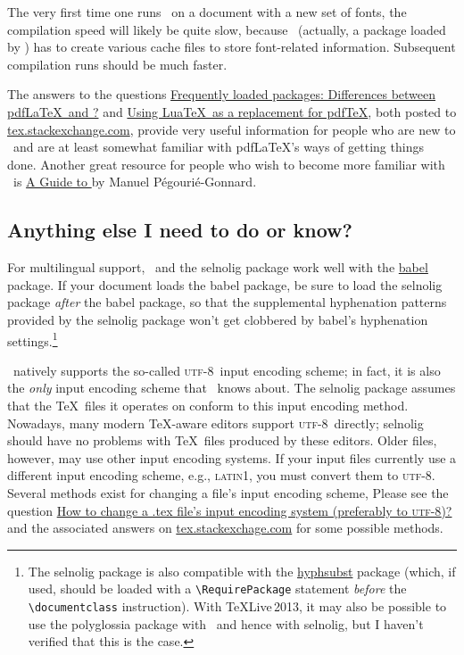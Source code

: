 \documentclass[11pt]{article}
\newcommand{\pkg}[1]{\textsf{#1}}
\newcommand\utf{\textsc{utf-8}}
\begin{document}
The very first time one runs \LuaLaTeX\ on a document with a new set of fonts, the compilation speed will likely be quite slow, because \LuaLaTeX\ (actually, a package loaded by \LuaLaTeX) has to create various cache files to store font-related information. Subsequent compilation runs should be much faster. 

The answers to the questions \href{http://tex.stackexchange.com/q/28642/5001}{Frequently loaded packages: Differences between pdf\LaTeX\ and \LuaLaTeX?} and \href{http://tex.stackexchange.com/q/32295/5001}{Using Lua\TeX\ as a replacement for pdf\TeX}, both posted to \href{http://tex.stackexchange.com/}{tex.stackexchange.com}, provide very useful information for people who are new to \LuaLaTeX\ and are at least somewhat familiar with pdf\LaTeX's ways of getting things done. Another great resource for people who wish to become more familiar with \LuaLaTeX\ is \href{http://mirror.ctan.org/info/luatex/lualatex-doc/lualatex-doc.pdf}{A Guide to \LuaLaTeX} by Manuel Pégourié-Gonnard.


\subsection{Anything else I need to do or know?} \label{sec:anythingelse}

For multilingual support, \LuaLaTeX\ and the \pkg{selnolig} package work well with the \href{http://www.ctan.org/pkg/babel}{\pkg{babel}} package. If your document loads the \pkg{babel} package, be sure to load the \pkg{selnolig} package \emph{after} the \pkg{babel} package, so that the supplemental hyphenation patterns provided by the \pkg{selnolig} package won't get clobbered by \pkg{babel}'s hyphenation settings.\footnote{The \pkg{selnolig} package is also compatible with the \href{http://www.ctan.org/pkg/hyphsubst}{\pkg{hyphsubst}} package (which, if used, should be loaded with a \Verb+\RequirePackage+ statement \emph{before} the \Verb+\documentclass+ instruction). With \TeX Live\,2013, it may also be possible to use the \pkg{polyglossia} package with \LuaLaTeX\ and hence with \pkg{selnolig}, but I haven't verified that this is the case.}

\LuaLaTeX\ natively supports the so-called \utf\ input encoding scheme; in fact, it is also the \emph{only} input encoding scheme that \LuaLaTeX\ knows about. The \pkg{selnolig} package assumes that the \TeX\ files it operates on conform to this input encoding method. Nowadays, many modern \TeX-aware editors support \utf\ directly; \pkg{selnolig} should have no problems with \TeX\ files produced by these editors. Older files, however, may use other input encoding systems. If your input files currently use a different input encoding scheme, e.g., \textsc{latin1}, you must convert them to \utf. Several methods exist for changing a file's input encoding scheme, Please see the question \href{http://tex.stackexchange.com/q/87406/5001}{How to change a .tex file's input encoding system (preferably to \utf)?} and the associated answers on \url{tex.stackexchage.com} for some possible methods.
\end{document}
